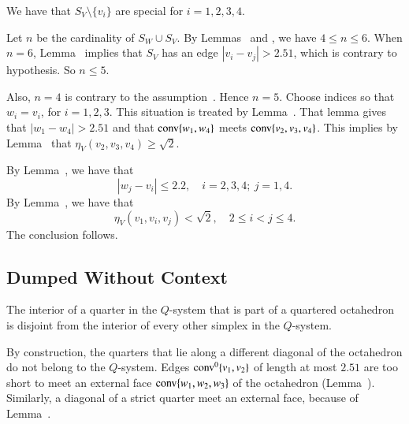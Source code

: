 \begin{tarskidata}
\begin{tarski}
\begin{proved}
We have that $S_V\setminus\{v_i\}$ are
special for $i=1,2,3,4$.

Let $n$ be the cardinality of $S_W\cup S_V$.  By Lemmas~
and , we have $4\le n\le 6$.  When
$n=6$, Lemma~ implies that $S_V$ has an edge
$|v_i-v_j|>2.51$, which is contrary to hypothesis.  So $n\le 5$.

Also, $n=4$ is contrary to the assumption~. 
Hence $n=5$.  
Choose indices so that $w_i=v_i$, for $i=1,2,3$. 
This situation is treated by Lemma~.
That lemma gives that $|w_1-w_4|>2.51$ and that
  ${\operatorname{conv}}\{w_1,w_4\}$ meets ${\operatorname{conv}}\{v_2,v_3,v_4\}$.
This implies by Lemma~ that 
$\eta_V(v_2,v_3,v_4)\ge\sqrt2$.

By Lemma~, we have that 
$$|w_j-v_i|\le 2.2,\quad i=2,3,4;\ j=1,4.$$
By Lemma~, we have that 
 $$\eta_V(v_1,v_i,v_j) < \sqrt2,\quad 2\le i < j \le 4.$$
The conclusion follows.
\swallowed\end{proved}
\end{tarski}



\begin{tarski}
\section{Dumped Without Context}

\begin{lemma} 
The interior of a quarter in the $Q$-system that is part of a
quartered octahedron is disjoint from the interior of every other
simplex in the $Q$-system.
\end{lemma}

\begin{proved} By construction, the quarters that lie along a
different diagonal of the octahedron do not belong to the
$Q$-system.  Edges ${\operatorname{conv}}^0\{v_1,v_2\}$  
of length at most $2.51$ are too short to meet
an external face ${\operatorname{conv}}\{w_1,w_2,w_3\}$ of the octahedron
(Lemma~). Similarly, a diagonal of a
strict quarter meet an external face,
because of Lemma~.
\swallowed\end{proved}
\end{tarski}




\end{tarskidata}
